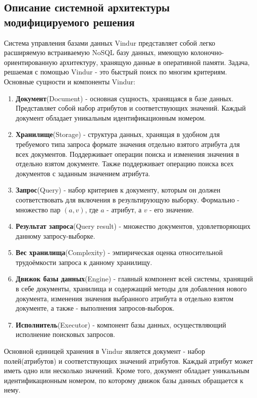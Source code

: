 \documentclass{matmex-diploma}
\begin{document}
    \subsection{Описание системной архитектуры модифицируемого решения}
    Система управления базами данных Vindur представляет собой легко расширяемую встраиваемую NoSQL базу данных, имеющую колоночно-ориентированную архитектуру, хранящую данные в оперативной памяти. Задача, решаемая с помощью Vindur - это быстрый поиск по многим критериям. 
    Основные сущности и компоненты Vindur:
        \begin{enumerate}
            \item \textbf{Документ}(Document) - основная сущность, хранящаяся в базе данных. Представляет собой набор атрибутов и соответствующих значений. Каждый документ обладает уникальным идентификационным номером.                 
            \item \textbf{Хранилище}(Storage) - структура данных, хранящая в удобном для требуемого типа запроса формате значения отдельно взятого атрибута для всех документов. Поддерживает операции поиска и изменения значения в отдельно взятом документе. Также поддерживает операцию поиска всех документов с заданным значением атрибута.
            \item \textbf{Запрос}(Query) - набор критериев к документу, которым он должен соответствовать для включения в результирующую выборку. Формально - множество пар $(a, v)$, где $a$ - атрибут, а $v$ - его значение. 
            \item \textbf{Результат запроса}(Query result) - множество документов, удовлетворяющих данному запросу-выборке.
            \item \textbf{Вес хранилища}(Complexity) - эмпирическая оценка относительной трудоёмкости запроса к данному хранилищу.
            \item \textbf{Движок базы данных}(Engine) - главный компонент всей системы, хранящий в себе документы, хранилища и содержащий методы для добавления нового документа, изменения значения выбранного атрибута в отдельно взятом документе, а также - выполнения запросов-выборок.
            \item \textbf{Исполнитель}(Executor) - компонент базы данных, осуществляющий исполнение поисковых запросов.
        \end{enumerate}
    
    Основной единицей хранения в Vindur является документ - набор полей(атрибутов) и соответствующих значений атрибутов. Каждый атрибут может иметь одно или несколько значений. Кроме того, документ обладает уникальным идентификационным номером, по которому движок базы данных обращается к нему. 
    
\end{document}
